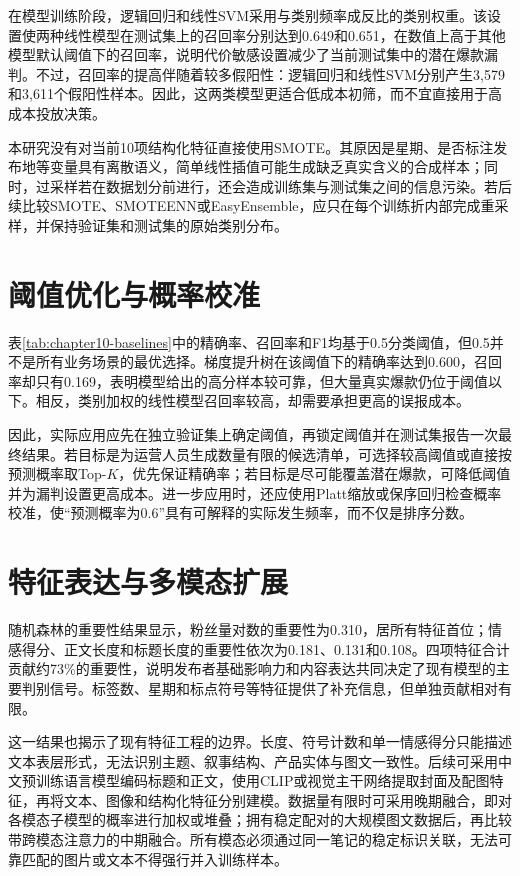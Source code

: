 在模型训练阶段，逻辑回归和线性SVM采用与类别频率成反比的类别权重。该设置使两种线性模型在测试集上的召回率分别达到0.649和0.651，在数值上高于其他模型默认阈值下的召回率，说明代价敏感设置减少了当前测试集中的潜在爆款漏判。不过，召回率的提高伴随着较多假阳性：逻辑回归和线性SVM分别产生3,579和3,611个假阳性样本。因此，这两类模型更适合低成本初筛，而不宜直接用于高成本投放决策。

本研究没有对当前10项结构化特征直接使用SMOTE。其原因是星期、是否标注发布地等变量具有离散语义，简单线性插值可能生成缺乏真实含义的合成样本；同时，过采样若在数据划分前进行，还会造成训练集与测试集之间的信息污染。若后续比较SMOTE、SMOTEENN或EasyEnsemble，应只在每个训练折内部完成重采样，并保持验证集和测试集的原始类别分布。

\section{阈值优化与概率校准}
表\ref{tab:chapter10-baselines}中的精确率、召回率和F1均基于0.5分类阈值，但0.5并不是所有业务场景的最优选择。梯度提升树在该阈值下的精确率达到0.600，召回率却只有0.169，表明模型给出的高分样本较可靠，但大量真实爆款仍位于阈值以下。相反，类别加权的线性模型召回率较高，却需要承担更高的误报成本。

因此，实际应用应先在独立验证集上确定阈值，再锁定阈值并在测试集报告一次最终结果。若目标是为运营人员生成数量有限的候选清单，可选择较高阈值或直接按预测概率取Top-$K$，优先保证精确率；若目标是尽可能覆盖潜在爆款，可降低阈值并为漏判设置更高成本。进一步应用时，还应使用Platt缩放或保序回归检查概率校准，使“预测概率为0.6”具有可解释的实际发生频率，而不仅是排序分数。

\section{特征表达与多模态扩展}
随机森林的重要性结果显示，粉丝量对数的重要性为0.310，居所有特征首位；情感得分、正文长度和标题长度的重要性依次为0.181、0.131和0.108。四项特征合计贡献约73\%的重要性，说明发布者基础影响力和内容表达共同决定了现有模型的主要判别信号。标签数、星期和标点符号等特征提供了补充信息，但单独贡献相对有限。

这一结果也揭示了现有特征工程的边界。长度、符号计数和单一情感得分只能描述文本表层形式，无法识别主题、叙事结构、产品实体与图文一致性。后续可采用中文预训练语言模型编码标题和正文，使用CLIP或视觉主干网络提取封面及配图特征，再将文本、图像和结构化特征分别建模。数据量有限时可采用晚期融合，即对各模态子模型的概率进行加权或堆叠；拥有稳定配对的大规模图文数据后，再比较带跨模态注意力的中期融合。所有模态必须通过同一笔记的稳定标识关联，无法可靠匹配的图片或文本不得强行并入训练样本。

